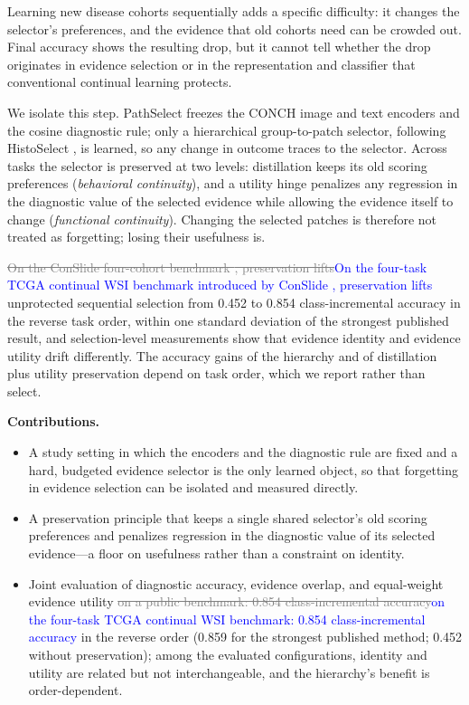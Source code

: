 \documentclass{article}
\newif\ifmarkup \markuptrue
\newcommand{\del}[1]{\ifmarkup\textcolor{gray}{\sout{#1}}\fi}
\newcommand{\ins}[1]{\ifmarkup\textcolor{blue}{#1}\else#1\fi}
\newcommand{\rep}[2]{\del{#1}\ins{#2}}
\begin{document}
Learning new disease cohorts sequentially adds a specific difficulty: it changes the selector's preferences, and the evidence that old cohorts need can be crowded out. Final accuracy shows the resulting drop, but it cannot tell whether the drop originates in evidence selection or in the representation and classifier that conventional continual learning protects.

We isolate this step. PathSelect freezes the CONCH image and text encoders \cite{lu2024conch} and the cosine diagnostic rule; only a hierarchical group-to-patch selector, following HistoSelect \cite{huang2026histoselect}, is learned, so any change in outcome traces to the selector. Across tasks the selector is preserved at two levels: distillation keeps its old scoring preferences (\emph{behavioral continuity}), and a utility hinge penalizes any regression in the diagnostic value of the selected evidence while allowing the evidence itself to change (\emph{functional continuity}). Changing the selected patches is therefore not treated as forgetting; losing their usefulness is.

\rep{On the ConSlide four-cohort benchmark \cite{huang2023conslide}, preservation lifts}{On the four-task TCGA continual WSI benchmark introduced by ConSlide \cite{huang2023conslide}, preservation lifts} unprotected sequential selection from 0.452 to 0.854 class-incremental accuracy in the reverse task order, within one standard deviation of the strongest published result, and selection-level measurements show that evidence identity and evidence utility drift differently. The accuracy gains of the hierarchy and of distillation plus utility preservation depend on task order, which we report rather than select.

\textbf{Contributions.}
\begin{itemize}
    \item A study setting in which the encoders and the diagnostic rule are fixed and a hard, budgeted evidence selector is the only learned object, so that forgetting in evidence selection can be isolated and measured directly.
    \item A preservation principle that keeps a single shared selector's old scoring preferences and penalizes regression in the diagnostic value of its selected evidence---a floor on usefulness rather than a constraint on identity.
    \item Joint evaluation of diagnostic accuracy, evidence overlap, and equal-weight evidence utility \rep{on a public benchmark: 0.854 class-incremental accuracy}{on the four-task TCGA continual WSI benchmark: 0.854 class-incremental accuracy} in the reverse order (0.859 for the strongest published method; 0.452 without preservation); among the evaluated configurations, identity and utility are related but not interchangeable, and the hierarchy's benefit is order-dependent.
\end{itemize}
\end{document}
